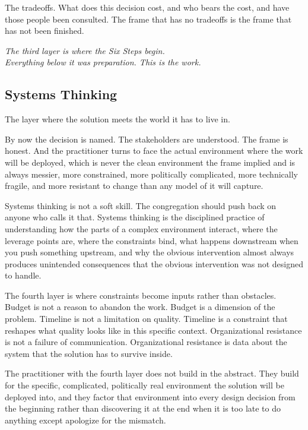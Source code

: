 The tradeoffs. What does this decision cost, and who bears the cost, and have those people been consulted. The frame that has no tradeoffs is the frame that has not been finished.

\begin{center}\small\itshape
  The third layer is where the Six Steps begin.\\
  Everything below it was preparation. This is the work.
\end{center}

\subsection*{Systems Thinking}

The layer where the solution meets the world it has to live in.

By now the decision is named. The stakeholders are understood. The frame is honest. And the practitioner turns to face the actual environment where the work will be deployed, which is never the clean environment the frame implied and is always messier, more constrained, more politically complicated, more technically fragile, and more resistant to change than any model of it will capture.

Systems thinking is not a soft skill. The congregation should push back on anyone who calls it that. Systems thinking is the disciplined practice of understanding how the parts of a complex environment interact, where the leverage points are, where the constraints bind, what happens downstream when you push something upstream, and why the obvious intervention almost always produces unintended consequences that the obvious intervention was not designed to handle.

The fourth layer is where constraints become inputs rather than obstacles. Budget is not a reason to abandon the work. Budget is a dimension of the problem. Timeline is not a limitation on quality. Timeline is a constraint that reshapes what quality looks like in this specific context. Organizational resistance is not a failure of communication. Organizational resistance is data about the system that the solution has to survive inside.

The practitioner with the fourth layer does not build in the abstract. They build for the specific, complicated, politically real environment the solution will be deployed into, and they factor that environment into every design decision from the beginning rather than discovering it at the end when it is too late to do anything except apologize for the mismatch.

